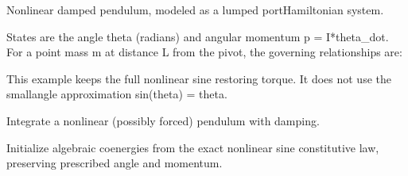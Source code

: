 \documentclass[letterpaper,10pt,english]{sphinxmanual}
\begin{document}
\sphinxAtStartPar
Nonlinear damped pendulum, modeled as a lumped port\sphinxhyphen{}Hamiltonian system.

\sphinxAtStartPar
States are the angle theta (radians) and angular momentum p = I*theta\_dot.
For a point mass m at distance L from the pivot, the governing
relationships are:

\begin{sphinxVerbatim}[commandchars=\\\{\}]
  
    
      
  
      
\end{sphinxVerbatim}

\sphinxAtStartPar
This example keeps the full nonlinear sine restoring torque. It does
not use the small\sphinxhyphen{}angle approximation sin(theta) = theta.


\begin{fulllineitems}

\pysigstartsignatures
\pysiglinewithargsret
{}
{\sphinxparamcomma {}\sphinxparamcomma {}\sphinxparamcomma {}\sphinxparamcomma {}\sphinxparamcomma {}\sphinxparamcomma {}\sphinxparamcomma {}}
{}
\pysigstopsignatures
\sphinxAtStartPar
Integrate a nonlinear (possibly forced) pendulum with damping.

\sphinxAtStartPar
Initialize algebraic co\sphinxhyphen{}energies from the exact nonlinear sine
constitutive law, preserving prescribed angle and momentum.

\end{fulllineitems}
\end{document}
